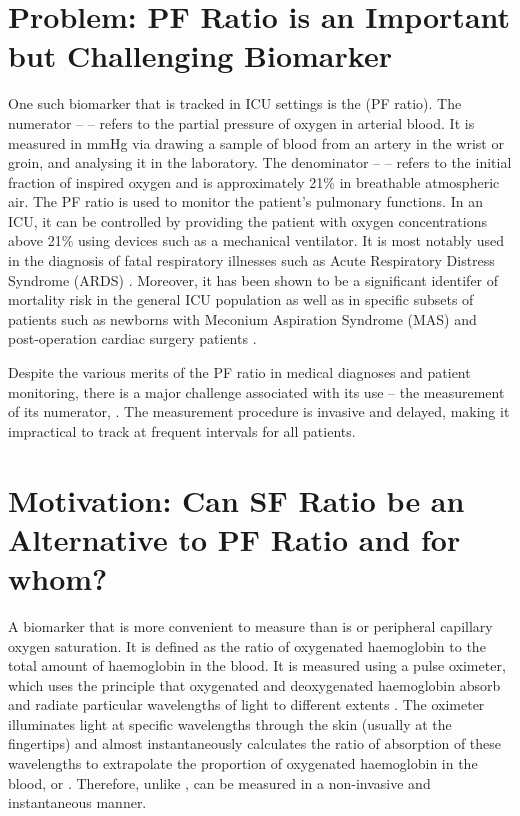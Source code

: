 \section{Problem: PF Ratio is an Important but Challenging Biomarker}

One such biomarker that is tracked in ICU settings is the  \PF(PF ratio). The numerator – \Pa – refers to the partial pressure of oxygen in arterial blood. It is measured in mmHg via drawing a sample of blood from an artery in the wrist or groin, and analysing it in the laboratory. The denominator – \Fi – refers to the initial fraction of inspired oxygen and is approximately 21\% in breathable atmospheric air. The PF ratio is used to monitor the patient's pulmonary functions. In an ICU, it can be controlled by providing the patient with oxygen concentrations above 21\% using devices such as a mechanical ventilator. It is most notably used in the diagnosis of fatal respiratory illnesses such as Acute Respiratory Distress Syndrome (ARDS) \citep{bernard1994american}. Moreover, it has been shown to be a significant identifer of mortality risk in the general ICU population \citep{villar2011risk} as well as in specific subsets of patients such as newborns with Meconium Aspiration Syndrome (MAS)  \citep{narayanan2019pao2} and post-operation cardiac surgery patients \citep{esteve2014evaluation}.

Despite the various merits of the PF ratio in medical diagnoses and patient monitoring, there is a major challenge associated with its use – the measurement of its numerator, \Pa. The \Pa measurement procedure is invasive and delayed, making it impractical to track \Pa at frequent intervals for all patients. 


\section{Motivation: Can SF Ratio be an Alternative to PF Ratio and for whom?}
A biomarker that is more convenient to measure than \Pa is \Sp or peripheral capillary oxygen saturation. It is defined as the ratio of oxygenated haemoglobin to the total amount of haemoglobin in the blood. It is measured using a pulse oximeter, which uses the principle that oxygenated and deoxygenated haemoglobin absorb and radiate particular wavelengths of light to different extents \citep{jubran1999pulse} . The oximeter illuminates light at specific wavelengths through the skin (usually at the fingertips) and almost instantaneously calculates the ratio of absorption of these wavelengths to extrapolate the proportion of oxygenated haemoglobin in the blood, or \Sp \citep{jubran2015}. Therefore, unlike \Pa, \Sp can be measured in a non-invasive and instantaneous manner. 

